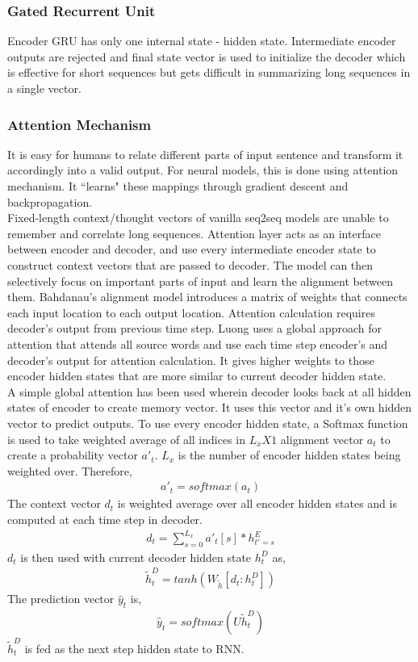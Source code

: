 \documentclass[11pt, oneside]{article}   	%
\begin{document}
\subsubsection{Gated Recurrent Unit}
Encoder GRU has only one internal state - hidden state. Intermediate encoder outputs are rejected and final state vector is used to initialize the decoder which is effective for short sequences but gets difficult in summarizing long sequences in a single vector.

\subsubsection{Attention Mechanism}
It is easy for humans to relate different parts of input sentence and transform it accordingly into a valid output. For neural models, this is done using attention mechanism. It ``learns" these mappings through gradient descent and backpropagation.\\
Fixed-length context/thought vectors of vanilla seq2seq models are unable to remember and correlate long sequences. Attention layer acts as an interface between encoder and decoder, and use every intermediate encoder state to construct context vectors that are passed to decoder. The model can then selectively focus on important parts of input and learn the alignment between them. Bahdanau's\cite{bahdanau2016neural} alignment model introduces a matrix of weights that connects each input location to each output location. Attention calculation requires decoder's output from previous time step. Luong \cite{luong-etal-2015-effective} uses a global approach for attention that attends all source words and use each time step encoder's and decoder's output for attention calculation. It gives higher weights to those encoder hidden states that are more similar to current decoder hidden state.\\
A simple global attention has been used wherein decoder looks back at all hidden states of encoder to create memory vector. It uses this vector and it's own hidden vector to predict outputs. To use every encoder hidden state, a Softmax function is used to take weighted average of all indices in $L_x X 1$ alignment vector $a_t$ to create a probability vector $a'_t$. $L_x$ is the number of encoder hidden states being weighted over. Therefore,
\begin{align*}
a'_t = softmax(a_t)
\end{align*}
The context vector $d_t$ is weighted average over all encoder hidden states and is computed at each time step in decoder.
\begin{align*}
d_t = \sum_{s=0}^{L_x}  a'_t[s] * h_{t'=s}^E
\end{align*}
$d_t$ is then used with current decoder hidden state $h_t^D$ as,
\begin{align*}
\tilde{h}_t^D = tanh(W_{\tilde{h}} [d_t : h_t^D])
\end{align*}
The prediction vector $\hat{y}_t$ is,
\begin{align*}
\hat{y}_t = softmax(U\tilde{h}_t^D )
\end{align*}
$\tilde{h}_t^D$ is fed as the next step hidden state to RNN.
\end{document}
